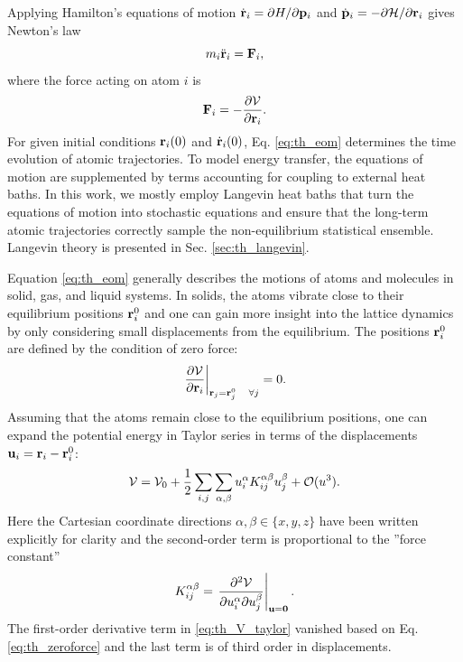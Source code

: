 Applying Hamilton's equations of motion $\dot{\mathbf{r}}_i=\partial H/\partial \mathbf{p}_i$ and $\dot{\mathbf{p}}_i=-\partial \mathcal{H}/\partial \mathbf{r}_i$ \cite{fetter} gives Newton's law
\begin{equation}
 m_i \ddot{\mathbf{r}}_i = \mathbf{F}_i, \label{eq:th_eom}
\end{equation}
where the force acting on atom $i$ is
\begin{equation}
 \mathbf{F}_i = - \frac{\partial \mathcal{V}}{\partial \mathbf{r}_i}. \label{eq:th_force}
\end{equation}
For given initial conditions $\mathbf{r}_i(0)$ and $\dot{\mathbf{r}}_i(0)$, Eq. \eqref{eq:th_eom} determines the time evolution of atomic trajectories. To model energy transfer, the equations of motion are supplemented by terms accounting for coupling to external heat baths. In this work, we mostly employ Langevin heat baths that turn the equations of motion into stochastic equations and ensure that the long-term atomic trajectories correctly sample the non-equilibrium statistical ensemble. Langevin theory is presented in Sec. \ref{sec:th_langevin}.

Equation \eqref{eq:th_eom} generally describes the motions of atoms and molecules in solid, gas, and liquid systems. In solids, the atoms vibrate close to their equilibrium positions $\mathbf{r}_i^0$ and one can gain more insight into the lattice dynamics by only considering small displacements from the equilibrium. The positions $\mathbf{r}_i^0$ are defined by the condition of zero force:
\begin{equation}
 \left. \frac{\partial \mathcal{V}}{\partial \mathbf{r}_i} \right|_{\mathbf{r}_j=\mathbf{r}_j^0 \quad \forall j} = 0. \label{eq:th_zeroforce}
\end{equation}
Assuming that the atoms remain close to the equilibrium positions, one can expand the potential energy in Taylor series in terms of the displacements $\mathbf{u}_i=\mathbf{r}_i-\mathbf{r}_i^0$:
\begin{equation}
 \mathcal{V} = \mathcal{V}_0 + \frac{1}{2} \sum_{i,j} \sum_{\alpha,\beta} u_i^{\alpha} K_{ij}^{\alpha \beta} u_j^{\beta}  + \mathcal{O}(u^3). \label{eq:th_V_taylor}
\end{equation}
Here the Cartesian coordinate directions $\alpha,\beta \in \{x,y,z\}$ have been written explicitly for clarity and the second-order term is proportional to the ''force constant''
\begin{equation}
 K_{ij}^{\alpha\beta} = \left. \frac{\partial^2 \mathcal{V}}{\partial u_i^{\alpha} \partial u_j^{\beta}} \right|_{\mathbf{u}=\mathbf{0}}. \label{eq:th_K_def}
\end{equation}
The first-order derivative term in \eqref{eq:th_V_taylor} vanished based on Eq. \eqref{eq:th_zeroforce} and the last term is of third order in displacements.

